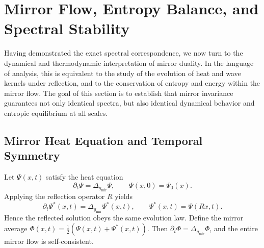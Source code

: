 
\section{Mirror Flow, Entropy Balance, and Spectral Stability}\relax \hspace{0pt}

Having demonstrated the exact spectral correspondence,
we now turn to the dynamical and thermodynamic interpretation
of mirror duality.
In the language of analysis,
this is equivalent to the study of the evolution of
heat and wave kernels under reflection,
and to the conservation of entropy and energy within the mirror flow.
The goal of this section is to establish that
mirror invariance guarantees not only identical spectra,
but also identical dynamical behavior
and entropic equilibrium at all scales.

\subsection{Mirror Heat Equation and Temporal Symmetry}\relax \hspace{0pt}

Let \(\Psi(x,t)\) satisfy the heat equation
\[
\partial_{t}\Psi = \Delta_{g_{\mathrm{mir}}}\Psi,
\qquad \Psi(x,0)=\Psi_{0}(x).
\]
Applying the reflection operator \(R\) yields
\[
\partial_{t}\Psi^{*}(x,t)
=\Delta_{g_{\mathrm{mir}}}\Psi^{*}(x,t),
\qquad \Psi^{*}(x,t)=\Psi(Rx,t).
\]
Hence the reflected solution obeys the same evolution law.
Define the mirror average
\(\Phi(x,t)=\tfrac{1}{2}(\Psi(x,t)+\Psi^{*}(x,t))\).
Then
\(\partial_{t}\Phi=\Delta_{g_{\mathrm{mir}}}\Phi\),
and the entire mirror flow is self-consistent.


